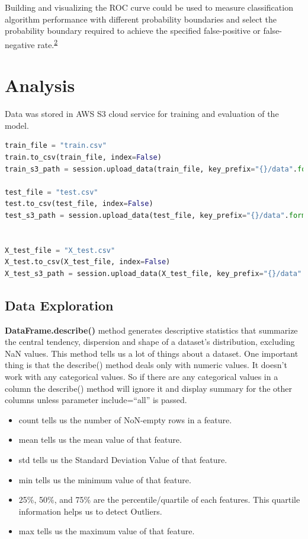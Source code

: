 \documentclass[
]{article}
\providecommand{\tightlist}{%
  \setlength{\itemsep}{0pt}\setlength{\parskip}{0pt}}
\begin{document}
Building and visualizing the ROC curve could be used to measure
classification algorithm performance with different probability
boundaries and select the probability boundary required to achieve the
specified false-positive or false-negative
rate.\textsuperscript{\protect\hyperlink{ref-volo}{2}}

\hypertarget{analysis}{%
\section{Analysis}\label{analysis}}

Data was stored in AWS S3 cloud service for training and evaluation of
the model.

\begin{lstlisting}[language=python]
train_file = "train.csv"
train.to_csv(train_file, index=False)
train_s3_path = session.upload_data(train_file, key_prefix="{}/data".format(prefix))

test_file = "test.csv"
test.to_csv(test_file, index=False)
test_s3_path = session.upload_data(test_file, key_prefix="{}/data".format(prefix))


X_test_file = "X_test.csv"
X_test.to_csv(X_test_file, index=False)
X_test_s3_path = session.upload_data(X_test_file, key_prefix="{}/data".format(prefix))
\end{lstlisting}

\hypertarget{data-exploration}{%
\subsection{Data Exploration}\label{data-exploration}}

\textbf{DataFrame.describe()} method generates descriptive statistics
that summarize the central tendency, dispersion and shape of a dataset's
distribution, excluding NaN values. This method tells us a lot of things
about a dataset. One important thing is that the describe() method deals
only with numeric values. It doesn't work with any categorical values.
So if there are any categorical values in a column the describe() method
will ignore it and display summary for the other columns unless
parameter include=``all'' is passed.

\begin{itemize}
\tightlist
\item
  count tells us the number of NoN-empty rows in a feature.
\item
  mean tells us the mean value of that feature.
\item
  std tells us the Standard Deviation Value of that feature.
\item
  min tells us the minimum value of that feature.
\item
  25\%, 50\%, and 75\% are the percentile/quartile of each features.
  This quartile information helps us to detect Outliers.
\item
  max tells us the maximum value of that feature.
\end{itemize}
\end{document}
